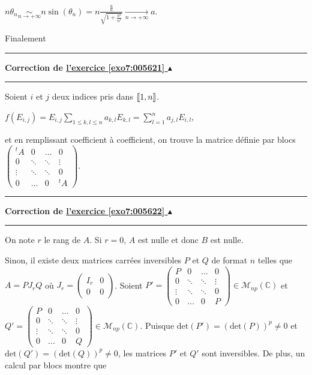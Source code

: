 \documentclass[11pt,a4paper]{article}
\newcommand{\Cc}{\mathbb{C}} \newcommand{\C}{\mathbb{C}}
\newcommand{\llbracket}{\left[\kern-0.15em\left[}
\newcommand{\rrbracket}{\right]\kern-0.15em\right]}
\newcounter{exo}
\newcommand{\correction}[1]{\hypertarget{cor7:#1}{}\label{cor7:#1}{\bf Correction de \hyperlink{exo7:#1}{l'exercice \ref{exo7:#1} $\blacktriangle$}}\vspace{1mm}\hrule\vspace{1mm}}
\newcommand{\fincorrection}{\vspace{1mm}\hrule\vspace*{7mm}}
\begin{document}
\begin{center}
$n\theta_n \underset{n\rightarrow+\infty}{\sim}n\sin(\theta_n)=n\frac{\frac{a}{n}}{\sqrt{1+\frac{a^2}{n^2}}}\underset{n\rightarrow+\infty}{\rightarrow}a$.
\end{center}

Finalement

\begin{center}
\end{center}
\fincorrection
\correction{005621}
Soient $i$ et $j$ deux indices pris dans $\llbracket1,n\rrbracket$.

\begin{center}
$f(E_{i,j})=E_{i,j}\sum_{1\leqslant k,l\leqslant n}^{}a_{k,l}E_{k,l}=\sum_{l=1}^{n}a_{j,l}E_{i,l}$,
\end{center}

et en remplissant coefficient à coefficient, on trouve la matrice 
définie par blocs $\left(
\begin{array}{cccc}
{^t}A&0&\ldots&0\\
0&\ddots&\ddots&\vdots\\
\vdots&\ddots&\ddots&0\\
0&\ldots&0&{^t}A
\end{array}
\right)$.
\fincorrection
\correction{005622}
On note $r$ le rang de $A$. Si $r=0$, $A$ est nulle et donc $B$ est nulle.

Sinon, il existe deux matrices carrées inversibles $P$ et $Q$ de format $n$ telles que $A=PJ_rQ$ où $J_r=\left(
\begin{array}{cc}
I_r&0\\
0&0
\end{array}
\right)$. Soient $P'=\left(
\begin{array}{cccc}
P&0&\ldots&0\\
0&\ddots&\ddots&\vdots\\
\vdots&\ddots&\ddots&0\\
0&\ldots&0&P
\end{array}
\right)\in\mathcal{M}_{np}(\Cc)$ et $Q'=\left(
\begin{array}{cccc}
P&0&\ldots&0\\
0&\ddots&\ddots&\vdots\\
\vdots&\ddots&\ddots&0\\
0&\ldots&0&Q
\end{array}
\right)\in\mathcal{M}_{np}(\Cc)$. Puisque $\text{det}(P')=(\text{det}(P))^p\neq0$ et $\text{det}(Q')=(\text{det}(Q))^p\neq0$, les matrices $P'$ et $Q'$ sont inversibles. De plus, un calcul par blocs montre que
\end{document}
